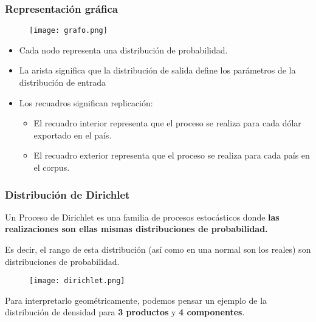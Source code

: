 \documentclass[class=article, crop=false]{standalone}
\begin{document}
\subsubsection{Representación gráfica}

\begin{figure}
\centering
\texttt{[image: grafo.png]}
\caption{\cite{blei2003latent}}
\end{figure}

\begin{itemize}
\item
Cada nodo representa una distribución de probabilidad.
\item
La arista significa que la distribución de salida define los
parámetros de la distribución de entrada
\item
Los recuadros significan replicación:

\begin{itemize}
	\item
	El recuadro interior representa que el proceso se realiza para cada
	dólar exportado en el país.
	\item
	El recuadro exterior representa que el proceso se realiza para cada
	país en el corpus.
\end{itemize}
\end{itemize}

\subsubsection{Distribución de Dirichlet}

Un Proceso de Dirichlet es una familia de procesos estocásticos donde
\textbf{las realizaciones son ellas mismas distribuciones de
probabilidad.}

Es decir, el rango de esta distribución (así como en una normal son los
reales) son distribuciones de probabilidad.

\begin{figure}
\centering
\texttt{[image: dirichlet.png]}
\caption{\cite{blei2003latent}}
\end{figure}

Para interpretarlo geométricamente, podemos pensar un ejemplo de la
distribución de densidad para \textbf{3 productos} y \textbf{4
componentes}.
\end{document}
